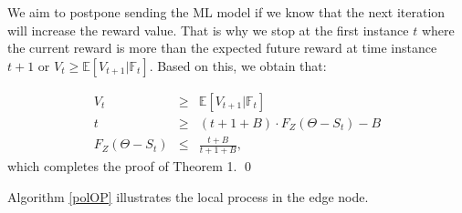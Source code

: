 \documentclass{mpaper}
\begin{document}
We aim to postpone sending the ML model if we know that the next iteration will increase the reward value. That is why we stop at the first instance $t$ where the current reward is more than the expected future reward at time instance $t+1$ or $V_{t} \geq \mathbb{E}[V_{t+1}|\mathbb{F}_{t}]$. Based on this, we obtain that:

\begin{eqnarray}
    V_t & \geq  & \mathbb{E}[V_{t+1}|\mathbb{F}_t] \\
    t & \geq  & (t+1+B)\cdot F_{Z}(\Theta - S_t) - B\\
    F_{Z}(\Theta - S_t) &\leq & \frac{t+B}{t+1+B},
\end{eqnarray}
which completes the proof of Theorem 1. 
\qed

Algorithm \ref{polOP} illustrates the local process in the edge node. 

\end{document}
